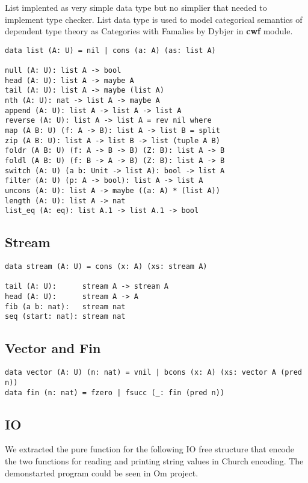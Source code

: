 \documentclass{article}
\begin{document}
List implented as very simple data type but no simplier
that needed to implement type checker. List data type is
used to model categorical semantics of dependent type theory
as Categories with Famalies by Dybjer in {\bf cwf} module.

\begin{lstlisting}[mathescape=true]
data list (A: U) = nil | cons (a: A) (as: list A)

null (A: U): list A -> bool
head (A: U): list A -> maybe A
tail (A: U): list A -> maybe (list A)
nth (A: U): nat -> list A -> maybe A
append (A: U): list A -> list A -> list A
reverse (A: U): list A -> list A = rev nil where
map (A B: U) (f: A -> B): list A -> list B = split
zip (A B: U): list A -> list B -> list (tuple A B)
foldr (A B: U) (f: A -> B -> B) (Z: B): list A -> B
foldl (A B: U) (f: B -> A -> B) (Z: B): list A -> B
switch (A: U) (a b: Unit -> list A): bool -> list A
filter (A: U) (p: A -> bool): list A -> list A
uncons (A: U): list A -> maybe ((a: A) * (list A))
length (A: U): list A -> nat
list_eq (A: eq): list A.1 -> list A.1 -> bool
\end{lstlisting}

\subsection{Stream}

\begin{lstlisting}[mathescape=true]
data stream (A: U) = cons (x: A) (xs: stream A)

tail (A: U):      stream A -> stream A
head (A: U):      stream A -> A
fib (a b: nat):   stream nat
seq (start: nat): stream nat
\end{lstlisting}

\subsection{Vector and Fin}

\begin{lstlisting}[mathescape=true]
data vector (A: U) (n: nat) = vnil | bcons (x: A) (xs: vector A (pred n))
data fin (n: nat) = fzero | fsucc (_: fin (pred n))
\end{lstlisting}

\subsection{IO}

We extracted the pure function for the following IO free structure that
encode the two functions for reading and printing string values in
Church encoding. The demonstarted program could be seen in Om project.
\end{document}
